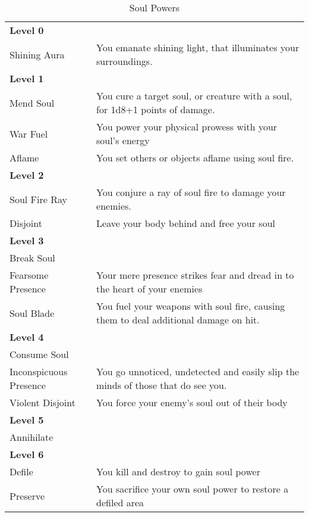 \begin{table*}[!htb]
  \caption{Soul Powers}
  \begin{tabular}{p{4cm} p{11cm}}
    \textbf{Level 0} & \nobreak \\
    Shining Aura     & You emanate shining light, that illuminates your surroundings. \\
    \textbf{Level 1} & \nobreak \\
    Mend Soul        & You cure a target soul, or creature with a soul, for 1d8+1 points of damage. \\
    War Fuel         & You power your physical prowess with your soul's energy \\
    Aflame           & You set others or objects aflame using soul fire. \\
    \textbf{Level 2} & \nobreak \\
    Soul Fire Ray    & You conjure a ray of soul fire to damage your enemies. \\
    Disjoint         & Leave your body behind and free your soul \\
    \textbf{Level 3} & \nobreak \\
    Break Soul       & \nobreak \\
    Fearsome Presence& Your mere presence strikes fear and dread in to the heart of your enemies \\
    Soul Blade       & You fuel your weapons with soul fire, causing them to deal additional damage on hit. \\
    \textbf{Level 4} & \nobreak \\
    Consume Soul     & \nobreak \\
    Inconspicuous Presence & You go unnoticed, undetected and easily slip the minds of those that do see you. \\
    Violent Disjoint & You force your enemy's soul out of their body \\
    \textbf{Level 5} & \nobreak \\
    Annihilate       & \nobreak \\
    \textbf{Level 6} & \nobreak \\
    Defile           & You kill and destroy to gain soul power \\
    Preserve         & You sacrifice your own soul power to restore a defiled area \\
  \end{tabular}
\end{table*}

